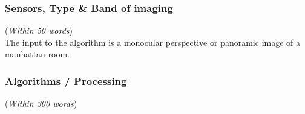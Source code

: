 \documentclass[11pt]{article}
\begin{document}
\subsubsection{Sensors, Type \& Band of imaging}
({\em Within 50 words}) \\

The input to the algorithm is a monocular perspective or panoramic image of a manhattan room.

\subsubsection{Algorithms / Processing} 
({\em Within 300 words})\\
\end{document}

